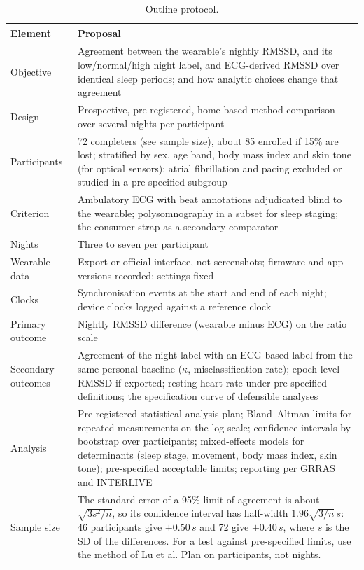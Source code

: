 \documentclass[11pt,a4paper]{article}
\begin{document}
\begin{table}[H]
\centering\small
\caption{Outline protocol.}
\label{tab:protocol}
\begin{tabularx}{\textwidth}{@{}p{}Y@{}}
\toprule
Element & Proposal \\
\midrule
Objective & Agreement between the wearable's nightly RMSSD, and its low/normal/high night label, and ECG-derived RMSSD over identical sleep periods; and how analytic choices change that agreement \\
Design & Prospective, pre-registered, home-based method comparison over several nights per participant \\
Participants & 72 completers (see sample size), about 85 enrolled if 15\% are lost; stratified by sex, age band, body mass index and skin tone (for optical sensors); atrial fibrillation and pacing excluded or studied in a pre-specified subgroup \\
Criterion & Ambulatory ECG with beat annotations adjudicated blind to the wearable; polysomnography in a subset for sleep staging; the consumer strap as a secondary comparator \\
Nights & Three to seven per participant \\
Wearable data & Export or official interface, not screenshots; firmware and app versions recorded; settings fixed \\
Clocks & Synchronisation events at the start and end of each night; device clocks logged against a reference clock \\
Primary outcome & Nightly RMSSD difference (wearable minus ECG) on the ratio scale \\
Secondary outcomes & Agreement of the night label with an ECG-based label from the same personal baseline ($\kappa$, misclassification rate); epoch-level RMSSD if exported; resting heart rate under pre-specified definitions; the specification curve of defensible analyses \\
Analysis & Pre-registered statistical analysis plan; Bland--Altman limits for repeated measurements on the log scale;\autocite{bland2007} confidence intervals by bootstrap over participants; mixed-effects models for determinants (sleep stage, movement, body mass index, skin tone); pre-specified acceptable limits; reporting per GRRAS and INTERLIVE\autocite{kottner2011,muhlen2021} \\
Sample size & The standard error of a 95\% limit of agreement is about $\sqrt{3s^2/n}$,\autocite{bland1986} so its confidence interval has half-width $1.96\sqrt{3/n}\,s$: 46 participants give $\pm0.50\,s$ and 72 give $\pm0.40\,s$, where $s$ is the SD of the differences. For a test against pre-specified limits, use the method of Lu et al.\autocite{lu2016} Plan on participants, not nights. \\
\bottomrule
\end{tabularx}
\end{table}
\end{document}
